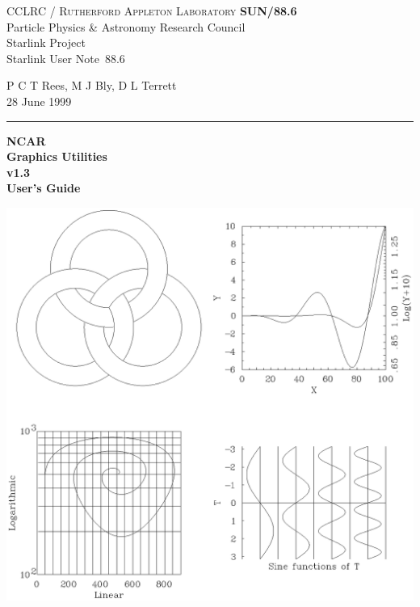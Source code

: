 \documentclass[twoside,11pt]{article}
\newcommand{\stardoccategory}  {Starlink User Note}
\newcommand{\stardocinitials}  {SUN}
\newcommand{\stardocnumber}    {88.6}
\newcommand{\stardocauthors}   {P C T Rees, M J Bly, D L Terrett}
\newcommand{\stardocdate}      {28 June 1999}
\newcommand{\stardoctitle}     {NCAR \\ [1ex] Graphics Utilities}
\newcommand{\stardocversion}   {v1.3}
\newcommand{\stardocmanual}    {User's Guide}
\newcommand{\stardocname}{\stardocinitials /\stardocnumber}
\newenvironment{latexonly}{}{}
\renewcommand{\_}{\texttt{\symbol{95}}}
\begin{document}
\thispagestyle{empty}

\begin{latexonly}
   CCLRC / \textsc{Rutherford Appleton Laboratory} \hfill \textbf{\stardocname}\\
   {\large Particle Physics \& Astronomy Research Council}\\
   {\large Starlink Project\\}
   {\large \stardoccategory\ \stardocnumber}
   \begin{flushright}
   \stardocauthors\\
   \stardocdate
   \end{flushright}
   \vspace{-4mm}
   \rule{\textwidth}{0.5mm}
   \vspace{5mm}
   \begin{center}
   {\Huge\textbf{\stardoctitle \\ [1.5ex]}}
   {\LARGE\textbf{\stardocversion \\ [2ex]}}
   {\Huge\textbf{\stardocmanual}}
   \end{center}
   \vspace{5mm}

\centering\includegraphics[viewport=0 360 450 800,scale=0.8,clip]{sun88_cover.eps}

\end{latexonly}
\end{document}
